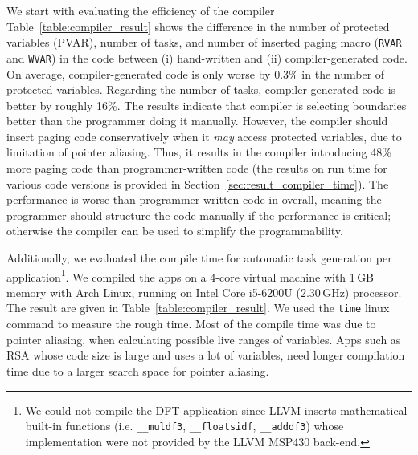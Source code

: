 We start with evaluating the efficiency of the \sys compiler Table~\ref{table:compiler_result} shows the difference in the number of protected variables (PVAR), number of tasks, and number of inserted paging macro ({\tt RVAR} and {\tt WVAR}) in the code between (i) hand-written \sys and (ii) compiler-generated \sys code. On average, compiler-generated code is only worse by 0.3\% in the number of protected variables. Regarding the number of tasks, compiler-generated code is better by roughly 16\%. The results indicate that \sys compiler is selecting boundaries better than the programmer doing it manually. However, the \sys compiler should insert paging code conservatively when it {\em may} access protected variables, due to limitation of pointer aliasing. Thus, it results in the \sys compiler introducing 48\% more paging code than programmer-written code (the results on run time for various \sys code versions is provided in Section~\ref{sec:result_compiler_time}). The performance is worse than programmer-written \sys code in overall, meaning the programmer should structure the code manually if the performance is critical; otherwise the compiler can be used to simplify the programmability. 

Additionally, we evaluated the compile time for automatic task generation per application\footnote{We could not compile the DFT application since LLVM inserts mathematical built-in functions (i.e. \texttt{\_\_muldf3}, \texttt{\_\_floatsidf}, \texttt{\_\_adddf3}) whose implementation were not provided by the LLVM MSP430 back-end.}. We compiled the apps on a 4-core virtual machine with 1\,GB memory with Arch Linux, running on Intel Core i5-6200U (2.30\,GHz) processor. The result are given in Table~\ref{table:compiler_result}. We used the {\tt time} linux command to measure the rough time. Most of the compile time was due to pointer aliasing, when calculating possible live ranges of variables. Apps such as RSA whose code size is large and uses a lot of variables, need longer compilation time due to a larger search space for pointer aliasing.

%

